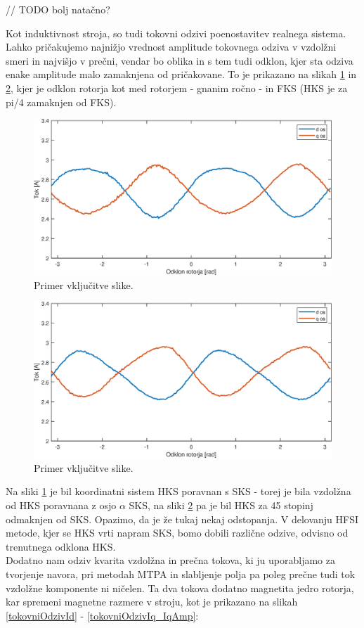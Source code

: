 \documentclass[a4paper,twoside,openright,12pt,slovene]{book}
\begin{document}
// TODO bolj natačno?

Kot induktivnost stroja, so tudi tokovni odzivi poenostavitev realnega sistema. Lahko pričakujemo najnižjo vrednost amplitude tokovnega odziva v vzdolžni smeri in najvišjo v prečni, vendar bo oblika
in s tem tudi odklon, kjer sta odziva enake amplitude malo zamaknjena od pričakovane. To je prikazano na slikah \ref{tokovniOdzivKot0} in \ref{tokovniOdzivKot45}, kjer je odklon rotorja kot med
rotorjem - gnanim ročno - in FKS (HKS je za pi/4 zamaknjen od FKS).

\begin{figure}[!htbp]
    \centering
    \includegraphics[width=1\columnwidth]{Slike/tokovniOdzivKot0.eps}
    \caption{\label{tokovniOdzivKot0} Primer vključitve slike.}
\end{figure}

\begin{figure}[!htbp]
    \centering
    \includegraphics[width=1\columnwidth]{Slike/tokovniOdzivKot45.eps}
    \caption{\label{tokovniOdzivKot45} Primer vključitve slike.}
\end{figure}

Na sliki \ref{tokovniOdzivKot0} je bil koordinatni sistem HKS poravnan s SKS - torej je bila vzdolžna od HKS poravnana z osjo $\alpha$ SKS, na sliki \ref{tokovniOdzivKot45} pa je bil HKS za 45 stopinj
odmaknjen od SKS. Opazimo, da je že tukaj nekaj odstopanja. V delovanju HFSI metode, kjer se HKS vrti napram SKS, bomo dobili različne odzive, odvisno od trenutnega odklona HKS. 
\\
Dodatno nam odziv kvarita vzdolžna in prečna tokova, ki ju uporabljamo za tvorjenje navora, pri metodah MTPA in slabljenje polja pa poleg prečne tudi tok vzdolžne komponente ni ničelen. Ta dva tokova
dodatno magnetita jedro rotorja, kar spremeni magnetne razmere v stroju, kot je prikazano na slikah \ref{tokovniOdzivId} - \ref{tokovniOdzivIq_IqAmp}:
\end{document}
